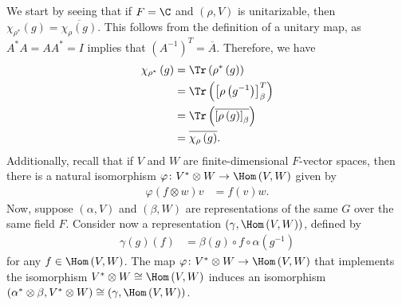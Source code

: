 \documentclass[10pt]{mypackage}
\begin{document}
We start by seeing that if $F = \C$ and $\left( \rho,V \right)$ is unitarizable, then $\chi_{\rho^{\ast}}(g) = \overline{\chi_{\rho}(g)}$. This follows from the definition of a unitary map, as $A^{\ast}A = AA^{\ast} = I$ implies that $\left( A^{-1} \right)^{T} = \overline{A}$. Therefore, we have
\begin{align*}
  \chi_{\rho^{\ast}}\left( g \right) &= \Tr\left( \rho^{\ast}\left( g \right) \right)\\
                                     &= \Tr\left( \left[ \rho\left( g^{-1} \right) \right]_{\beta}^{T} \right)\\
                                     &= \Tr\left( \overline{\left[ \rho\left( g \right) \right]_{\beta}} \right)\\
                                     &= \overline{\chi_{\rho}\left( g \right)}.
\end{align*}
Additionally, recall that if $V$ and $W$ are finite-dimensional $F$-vector spaces, then there is a natural isomorphism $\varphi\colon V^{\ast}\otimes W \rightarrow \Hom\left( V,W \right)$ given by
\begin{align*}
  \varphi\left( f\otimes w \right)v &= f(v)w.
\end{align*}
Now, suppose $\left( \alpha,V \right)$ and $\left( \beta,W \right)$ are representations of the same $G$ over the same field $F$. Consider now a representation $\left( \gamma,\Hom\left( V,W \right) \right)$, defined by
\begin{align*}
  \gamma(g)\left( f \right) &= \beta(g)\circ f \circ \alpha\left( g^{-1} \right)
\end{align*}
for any $f\in \Hom\left( V,W \right)$. The map $\varphi\colon V^{\ast}\otimes W \rightarrow \Hom\left( V,W \right)$ that implements the isomorphism $V^{\ast}\otimes W \cong \Hom\left( V,W \right)$ induces an isomorphism $\left( \alpha^{\ast}\otimes \beta,V^{\ast}\otimes W \right)\cong \left( \gamma,\Hom\left( V,W \right) \right)$.
\end{document}

